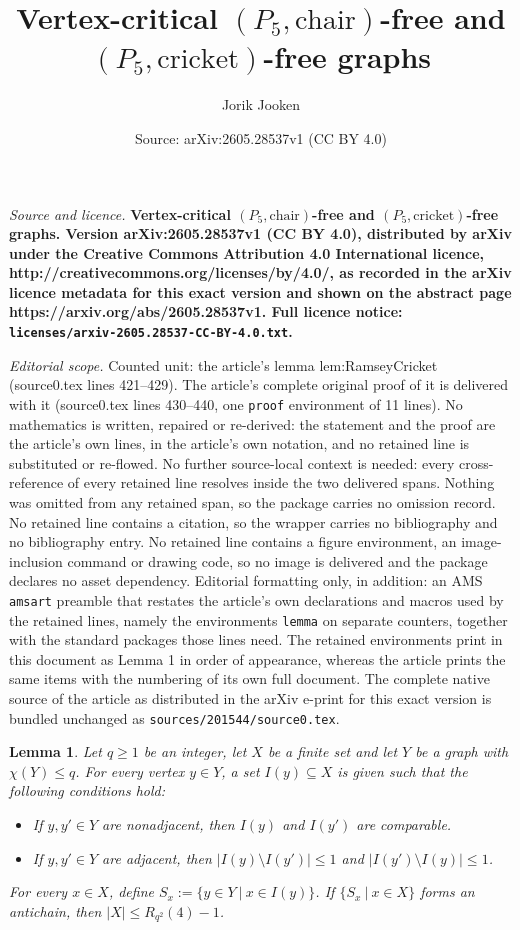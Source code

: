 \documentclass[10pt,a4paper]{amsart}
\title{\bf Vertex-critical $(P_5,\text{chair})$-free and $(P_5,\text{cricket})$-free graphs}
\author{Jorik Jooken}
\date{Source: arXiv:2605.28537v1 (CC BY 4.0)}
\newtheorem{lemma}{Lemma}
\begin{document}
\maketitle

\noindent\emph{Source and licence.} \bf Vertex-critical $(P_5,\text{chair})$-free and $(P_5,\text{cricket})$-free graphs. Version arXiv:2605.28537v1 (CC BY 4.0), distributed by arXiv under the Creative Commons Attribution 4.0 International licence, http://creativecommons.org/licenses/by/4.0/, as recorded in the arXiv licence metadata for this exact version and shown on the abstract page https://arxiv.org/abs/2605.28537v1. Full licence notice: \texttt{licenses/arxiv-2605.28537-CC-BY-4.0.txt}.\par\smallskip

\noindent\textit{Editorial scope.} Counted unit: the article's lemma lem:RamseyCricket (source0.tex lines 421--429). The article's complete original proof of it is delivered with it (source0.tex lines 430--440, one \texttt{proof} environment of 11 lines). No mathematics is written, repaired or re-derived: the statement and the proof are the article's own lines, in the article's own notation, and no retained line is substituted or re-flowed.  No further source-local context is needed: every cross-reference of every retained line resolves inside the two delivered spans.  Nothing was omitted from any retained span, so the package carries no omission record.  No retained line contains a citation, so the wrapper carries no bibliography and no bibliography entry.  No retained line contains a figure environment, an image-inclusion command or drawing code, so no image is delivered and the package declares no asset dependency.  Editorial formatting only, in addition: an AMS \texttt{amsart} preamble that restates the article's own declarations and macros used by the retained lines, namely the environments \texttt{lemma} on separate counters, together with the standard packages those lines need.  The retained environments print in this document as Lemma 1 in order of appearance, whereas the article prints the same items with the numbering of its own full document.  The complete native source of the article as distributed in the arXiv e-print for this exact version is bundled unchanged as \texttt{sources/201544/source0.tex}.
\begin{lemma}
\label{lem:RamseyCricket}
Let $q \geq 1$ be an integer, let $X$ be a finite set and let $Y$ be a graph with $\chi(Y) \leq q$. For every vertex $y \in Y$, a set $I(y) \subseteq X$ is given such that the following conditions hold:
\begin{itemize}
    \item If $y,y' \in Y$ are nonadjacent, then $I(y)$ and $I(y')$ are comparable.
    \item If $y,y' \in Y$ are adjacent, then $|I(y) \setminus I(y')| \leq 1$ and $|I(y') \setminus I(y)| \leq 1$.
\end{itemize}
For every $x \in X$, define $S_x := \{y \in Y~|~x \in I(y)\}$. If $\{S_x~|~x \in X\}$ forms an antichain, then $|X| \leq R_{q^2}(4)-1$.
\end{lemma}
\end{document}
